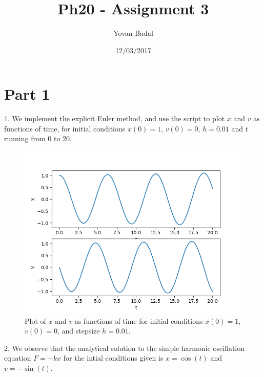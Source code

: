 \documentclass[11pt]{article}
\begin{document}
	\title{Ph20 - Assignment 3}
	\author{Yovan Badal}
	\date{12/03/2017}
	\maketitle
	
\section*{Part 1}
1. We implement the explicit Euler method, and use the script to plot $x$ and $v$ as functions of time, for initial conditions $x(0) = 1$, $v(0) = 0$, $h = 0.01$ and $t$ running from 0 to 20.
\begin{figure}[htp]
\centering
\includegraphics[scale=0.54]{x_and_v_plot_1_0_0.01_20.png}
\caption{Plot of $x$ and $v$ as functions of time for initial conditions $x(0) = 1$, $v(0) = 0$, and stepsize $h = 0.01$.}
\label{explicit}
\end{figure}
\newpage

2. We observe that the analytical solution to the simple harmonic oscillation equation $F = -kx$ for the intial conditions given is $x = \cos(t)$ and $v = -\sin(t)$.
\end{document}

